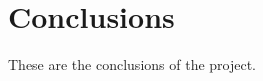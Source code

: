 \chapter*{Conclusions}\label{chap:conclusions}

These are the conclusions of the project.

\clearpage{\thispagestyle{empty}}

